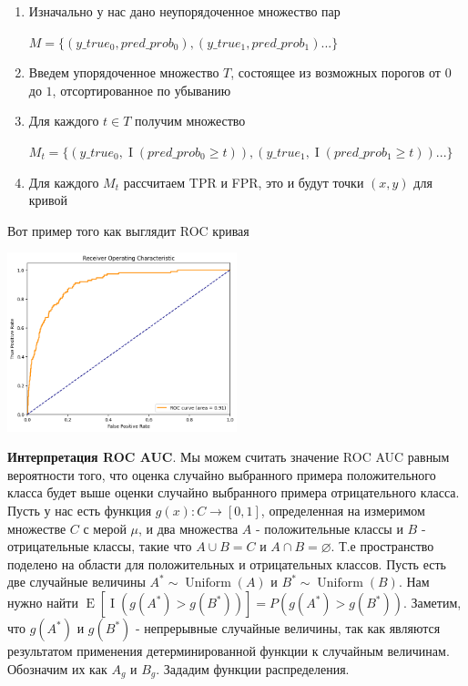 \documentclass{article}
\begin{document}
    \begin{enumerate}
        \item Изначально у нас дано неупорядоченное множество пар 
        
        $M = \{(y\_true_{0}, pred\_prob_{0}), (y\_true_{1}, pred\_prob_{1}) ... \}$

        \item Введем упорядоченное множество $T$, состоящее из возможных порогов от $0$ до $1$, отсортированное по убыванию  
        \item Для каждого $t \in T$ получим множество 
        
        $M_{t} = \{(y\_true_{0}, \operatorname{I}(pred\_prob_{0} \geq t)), (y\_true_{1}, \operatorname{I}(pred\_prob_{1} \geq t)) ... \}$
        \item Для каждого $M_t$ рассчитаем TPR и FPR, это и будут точки $(x, y)$ для кривой 
    \end{enumerate}

    Вот пример того как выглядит ROC кривая 

    \begin{center}
        \includegraphics[width=0.5\textwidth]{photos/roc.png}
    \end{center}

    \quad 

    \textbf{Интерпретация ROC AUC}. Мы можем считать значение ROC AUC равным вероятности того, что оценка случайно выбранного примера положительного класса
    будет выше оценки случайно выбранного примера отрицательного класса.  Пусть у нас есть функция $g(x): C \rightarrow [0, 1]$, определенная
    на измеримом множестве $C$ с мерой $\mu$, и два множества $A$ - положительные классы и $B$ - отрицательные классы, 
    такие что $A \cup B = C$ и $A \cap B = \varnothing$. 
    Т.е пространство поделено на области для положительных и отрицательных классов.
    Пусть есть две случайные величины $A^* \sim \operatorname{Uniform}(A)$ и $B^* \sim \operatorname{Uniform}(B)$. Нам нужно найти 
    $\operatorname{E}[\operatorname{I}(g(A^*) > g(B^*))] = P(g(A^*) > g(B^*))$. Заметим, что $g(A^*)$ и $g(B^*)$ - непрерывные случайные величины, так как являются
    результатом применения детерминированной функции к случайным величинам. Обозначим их как $A_{g}$ и $B_{g}$. Зададим функции распределения.
\end{document}
